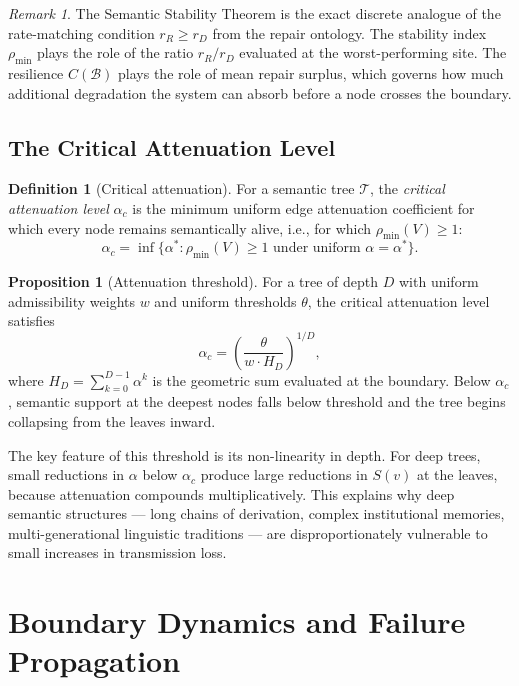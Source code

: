 \documentclass[11pt, a4paper]{article}
\theoremstyle{definition}
\newtheorem{definition}{Definition}
\newtheorem{proposition}{Proposition}
\theoremstyle{remark}
\newtheorem{remark}{Remark}
\begin{document}
\begin{remark}
The Semantic Stability Theorem is the exact discrete analogue of the
rate-matching condition $r_R \geq r_D$ from the repair ontology. The stability
index $\rho_{\min}$ plays the role of the ratio $r_R/r_D$ evaluated at the
worst-performing site. The resilience $C(\mathcal{B})$ plays the role of
mean repair surplus, which governs how much additional degradation the system
can absorb before a node crosses the boundary.
\end{remark}

\subsection{The Critical Attenuation Level}

\begin{definition}[Critical attenuation]
For a semantic tree $\mathcal{T}$, the \textit{critical attenuation level}
$\alpha_c$ is the minimum uniform edge attenuation coefficient for which
every node remains semantically alive, i.e., for which
$\rho_{\min}(V) \geq 1$:
\[
\alpha_c = \inf\{\alpha^* : \rho_{\min}(V) \geq 1 \text{ under uniform } \alpha = \alpha^*\}.
\]
\end{definition}

\begin{proposition}[Attenuation threshold]
For a tree of depth $D$ with uniform admissibility weights $w$ and uniform
thresholds $\theta$, the critical attenuation level satisfies
\[
\alpha_c = \left(\frac{\theta}{w \cdot H_D}\right)^{1/D},
\]
where $H_D = \sum_{k=0}^{D-1} \alpha^k$ is the geometric sum evaluated at
the boundary. Below $\alpha_c$, semantic support at the deepest nodes falls
below threshold and the tree begins collapsing from the leaves inward.
\end{proposition}

The key feature of this threshold is its non-linearity in depth. For deep
trees, small reductions in $\alpha$ below $\alpha_c$ produce large reductions
in $S(v)$ at the leaves, because attenuation compounds multiplicatively. This
explains why deep semantic structures --- long chains of derivation, complex
institutional memories, multi-generational linguistic traditions --- are
disproportionately vulnerable to small increases in transmission loss.

\section{Boundary Dynamics and Failure Propagation}
\end{document}
